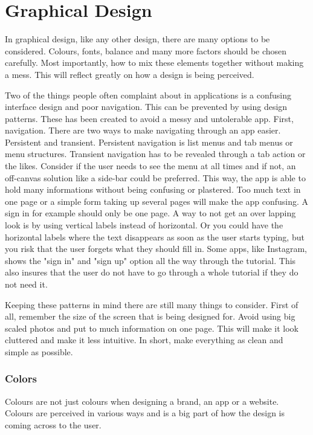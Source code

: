 \section{Graphical Design}
In graphical design, like any other design, there are many options to be considered. Colours, fonts, balance and many more factors should be chosen carefully. Most importantly, how to mix these elements together without making a mess. 
This will reflect greatly on how a design is being perceived. \cite{ColorMeaning}

Two of the things people often complaint about in applications is a confusing interface design and poor navigation. \cite{Pattern} This can be prevented by using design patterns. These has been created to avoid a messy and untolerable app.
First, navigation. There are two ways to make navigating through an app easier. Persistent and transient. Persistent navigation is list menus and tab menus or menu structures. Transient navigation has to be revealed through a tab action or the likes.\cite{Pattern}
Consider if the user needs to see the menu at all times and if not, an off-canvas solution like a side-bar could be preferred.\cite{Pattern} This way, the app is able to hold many informations without being confusing or plastered.  
Too much text in one page or a simple form taking up several pages will make the app confusing. A sign in for example should only be one page. A way to not get an over lapping look is by using vertical labels instead of horizontal. \cite{Pattern} Or you could have the horizontal labels where the text disappears as soon as the user starts typing, but you risk that the user forgets what they should fill in.\cite{Pattern} 
Some apps, like Instagram, shows the "sign in" and "sign up" option all the way through the tutorial. This also insures that the user do not have to go through a whole tutorial if they do not need it. 

Keeping these patterns in mind there are still many things to consider. 
First of all, remember the size of the screen that is being designed for. Avoid using big scaled photos and put to much information on one page. This will make it look cluttered and make it less intuitive. \cite{Graphic}
In short, make everything as clean and simple as possible. 

\subsubsection{Colors}

Colours are not just colours when designing a brand, an app or a website. Colours are perceived in various ways and is a big part of how the design is coming  across to the user. \cite{ColorMeaning}

